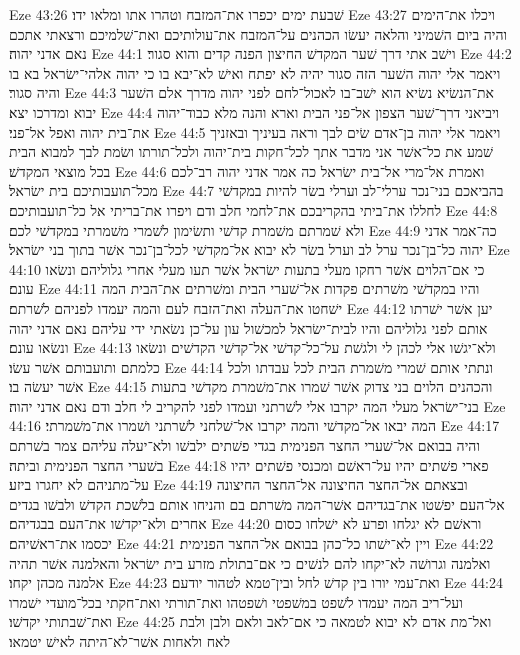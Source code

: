 Eze 43:26  שׁבעת ימים יכפרו את־המזבח וטהרו אתו ומלאו ידו׃
Eze 43:27  ויכלו את־הימים והיה ביום השׁמיני והלאה יעשׂו הכהנים על־המזבח את־עולותיכם ואת־שׁלמיכם ורצאתי אתכם נאם אדני יהוה׃
Eze 44:1  וישׁב אתי דרך שׁער המקדשׁ החיצון הפנה קדים והוא סגור׃
Eze 44:2  ויאמר אלי יהוה השׁער הזה סגור יהיה לא יפתח ואישׁ לא־יבא בו כי יהוה אלהי־ישׂראל בא בו והיה סגור׃
Eze 44:3  את־הנשׂיא נשׂיא הוא ישׁב־בו לאכול־לחם לפני יהוה מדרך אלם השׁער יבוא ומדרכו יצא׃
Eze 44:4  ויביאני דרך־שׁער הצפון אל־פני הבית וארא והנה מלא כבוד־יהוה את־בית יהוה ואפל אל־פני׃
Eze 44:5  ויאמר אלי יהוה בן־אדם שׂים לבך וראה בעיניך ובאזניך שׁמע את כל־אשׁר אני מדבר אתך לכל־חקות בית־יהוה ולכל־תורתו ושׂמת לבך למבוא הבית בכל מוצאי המקדשׁ׃
Eze 44:6  ואמרת אל־מרי אל־בית ישׂראל כה אמר אדני יהוה רב־לכם מכל־תועבותיכם בית ישׂראל׃
Eze 44:7  בהביאכם בני־נכר ערלי־לב וערלי בשׂר להיות במקדשׁי לחללו את־ביתי בהקריבכם את־לחמי חלב ודם ויפרו את־בריתי אל כל־תועבותיכם׃
Eze 44:8  ולא שׁמרתם משׁמרת קדשׁי ותשׂימון לשׁמרי משׁמרתי במקדשׁי לכם׃
Eze 44:9  כה־אמר אדני יהוה כל־בן־נכר ערל לב וערל בשׂר לא יבוא אל־מקדשׁי לכל־בן־נכר אשׁר בתוך בני ישׂראל׃
Eze 44:10  כי אם־הלוים אשׁר רחקו מעלי בתעות ישׂראל אשׁר תעו מעלי אחרי גלוליהם ונשׂאו עונם׃
Eze 44:11  והיו במקדשׁי משׁרתים פקדות אל־שׁערי הבית ומשׁרתים את־הבית המה ישׁחטו את־העלה ואת־הזבח לעם והמה יעמדו לפניהם לשׁרתם׃
Eze 44:12  יען אשׁר ישׁרתו אותם לפני גלוליהם והיו לבית־ישׂראל למכשׁול עון על־כן נשׂאתי ידי עליהם נאם אדני יהוה ונשׂאו עונם׃
Eze 44:13  ולא־יגשׁו אלי לכהן לי ולגשׁת על־כל־קדשׁי אל־קדשׁי הקדשׁים ונשׂאו כלמתם ותועבותם אשׁר עשׂו׃
Eze 44:14  ונתתי אותם שׁמרי משׁמרת הבית לכל עבדתו ולכל אשׁר יעשׂה בו׃
Eze 44:15  והכהנים הלוים בני צדוק אשׁר שׁמרו את־משׁמרת מקדשׁי בתעות בני־ישׂראל מעלי המה יקרבו אלי לשׁרתני ועמדו לפני להקריב לי חלב ודם נאם אדני יהוה׃
Eze 44:16  המה יבאו אל־מקדשׁי והמה יקרבו אל־שׁלחני לשׁרתני ושׁמרו את־משׁמרתי׃
Eze 44:17  והיה בבואם אל־שׁערי החצר הפנימית בגדי פשׁתים ילבשׁו ולא־יעלה עליהם צמר בשׁרתם בשׁערי החצר הפנימית וביתה׃
Eze 44:18  פארי פשׁתים יהיו על־ראשׁם ומכנסי פשׁתים יהיו על־מתניהם לא יחגרו ביזע׃
Eze 44:19  ובצאתם אל־החצר החיצונה אל־החצר החיצונה אל־העם יפשׁטו את־בגדיהם אשׁר־המה משׁרתם בם והניחו אותם בלשׁכת הקדשׁ ולבשׁו בגדים אחרים ולא־יקדשׁו את־העם בבגדיהם׃
Eze 44:20  וראשׁם לא יגלחו ופרע לא ישׁלחו כסום יכסמו את־ראשׁיהם׃
Eze 44:21  ויין לא־ישׁתו כל־כהן בבואם אל־החצר הפנימית׃
Eze 44:22  ואלמנה וגרושׁה לא־יקחו להם לנשׁים כי אם־בתולת מזרע בית ישׂראל והאלמנה אשׁר תהיה אלמנה מכהן יקחו׃
Eze 44:23  ואת־עמי יורו בין קדשׁ לחל ובין־טמא לטהור יודעם׃
Eze 44:24  ועל־ריב המה יעמדו לשׁפט במשׁפטי ושׁפטהו ואת־תורתי ואת־חקתי בכל־מועדי ישׁמרו ואת־שׁבתותי יקדשׁו׃
Eze 44:25  ואל־מת אדם לא יבוא לטמאה כי אם־לאב ולאם ולבן ולבת לאח ולאחות אשׁר־לא־היתה לאישׁ יטמאו׃
